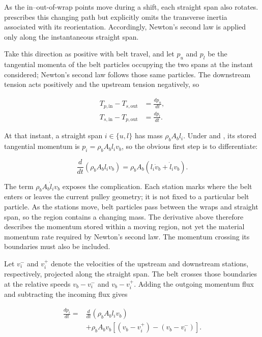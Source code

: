 \documentclass[11pt]{report}
\numberwithin{equation}{section}
\newcounter{assump}
\begin{document}
As the in--out-of-wrap points move during a shift, each straight span also
rotates.  prescribes this changing path but
explicitly omits the transverse inertia associated with its reorientation.
Accordingly, Newton's second law is applied only along the instantaneous
straight span.

Take this direction as positive with belt travel, and let $p_u$ and $p_l$ be
the tangential momenta of the belt particles occupying the two spans at the
instant considered; Newton's second law follows those same particles. The
downstream tension acts positively and the upstream tension negatively, so

\begin{equation}
\begin{aligned}
    T_{p,\mathrm{in}}-T_{s,\mathrm{out}}
    &=
    \frac{dp_u}{dt},
    \\
    T_{s,\mathrm{in}}-T_{p,\mathrm{out}}
    &=
    \frac{dp_l}{dt}.
\end{aligned}
    \label{eq:straight_span_newton_balances}
\end{equation}

At that instant, a straight span $i\in\{u,l\}$ has mass $\rho_bA_b l_i$.
Under  and
, its stored tangential momentum is
$p_i=\rho_bA_b l_i v_b$, so the obvious first step is to differentiate:

\[
    \frac{d}{dt}\left(\rho_bA_b l_i v_b\right)
    =
    \rho_bA_b\left(l_i\dot v_b+\dot l_i v_b\right).
\]

The term $\rho_bA_b\dot l_i v_b$ exposes the complication. Each station marks
where the belt enters or leaves the current pulley geometry; it is not fixed
to a particular belt particle. As the stations move, belt particles pass
between the wraps and straight span, so the region contains a changing mass.
The derivative above therefore describes the momentum stored within a moving
region, not yet the material momentum rate required by Newton's second law.
The momentum crossing its boundaries must also be included.

Let $v_i^{-}$ and $v_i^{+}$ denote the velocities of the upstream and
downstream stations, respectively, projected along the straight span. The
belt crosses those boundaries at the relative speeds $v_b-v_i^{-}$ and
$v_b-v_i^{+}$. Adding the outgoing momentum flux and subtracting the incoming
flux gives

\begin{equation}
\begin{aligned}
    \frac{dp_i}{dt}
    ={}&
    \frac{d}{dt}
    \left(
        \rho_bA_b l_i v_b
    \right)
    \\
    &+
    \rho_bA_bv_b
    \left[
        \left(v_b-v_i^{+}\right)
        -
        \left(v_b-v_i^{-}\right)
    \right].
\end{aligned}
    \label{eq:moving_straight_span_momentum_rate}
\end{equation}
\end{document}

